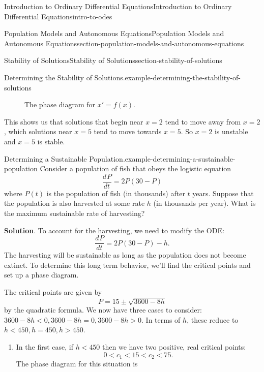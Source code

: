 \documentclass[oneside,10pt,]{book}
\numberwithin{equation}{section}
\newcommand{\dv}[3][]{\dfrac{d^{#1} #2}{d #3^{#1}}}
\newcommand{\lt}{<}
\newcommand{\gt}{>}
\begin{document}
\begin{chapterptx}{Introduction to Ordinary Differential Equations}{}{Introduction to Ordinary Differential Equations}{}{}{intro-to-odes}
\begin{sectionptx}{Population Models and Autonomous Equations}{}{Population Models and Autonomous Equations}{}{}{section-population-models-and-autonomous-equations}
\begin{subsectionptx}{Stability of Solutions}{}{Stability of Solutions}{}{}{section-stability-of-solutions}
\begin{example}{Determining the Stability of Solutions.}{example-determining-the-stability-of-solutions}
\begin{figure}
{
}
\caption{The phase diagram for \(x' = f(x).\)\label{figure-7}}
\end{figure}
\hypertarget{p-127}{}%
This shows us that solutions that begin near \(x = 2\) tend to move away from \(x = 2\), which solutions near \(x = 5\) tend to move towards \(x = 5\). So \(x = 2\) is unstable and \(x = 5\) is stable.%
\end{example}
\begin{example}{Determining a Sustainable Population.}{example-determining-a-sustainable-population}%
\hypertarget{p-128}{}%
Consider a population of fish that obeys the logistic equation%
\begin{equation*}
\dv{P}{t} = 2P(30 - P)
\end{equation*}
where \(P(t)\) is the population of fish (in thousands) after \(t\) years. Suppose that the population is also harvested at some rate \(h\) (in thousands per year). What is the maximum sustainable rate of harvesting?%
\par\smallskip%
\noindent\textbf{Solution}.\hypertarget{solution-22}{}\quad%
\hypertarget{p-129}{}%
To account for the harvesting, we need to modify the ODE:%
\begin{equation*}
\dv{P}{t} = 2P(30 - P) - h.
\end{equation*}
The harvesting will be sustainable as long as the population does not become extinct. To determine this long term behavior, we'll find the critical points and set up a phase diagram.%
\par
\hypertarget{p-130}{}%
The critical points are given by%
\begin{equation*}
P = 15 \pm \sqrt{3600 - 8h}
\end{equation*}
by the quadratic formula. We now have three cases to consider: \(3600 - 8h \lt 0, 3600 - 8h = 0, 3600 - 8h \gt 0.\) In terms of \(h\), these reduce to \(h \lt 450, h = 450, h \gt 450\).%
\leavevmode%
\begin{enumerate}
\item\hypertarget{li-11}{}\hypertarget{p-131}{}%
In the first case, if \(h \lt 450\) then we have two positive, real critical points:%
\begin{equation*}
0 \lt c_{1} \lt 15 \lt c_{2} \lt 75.
\end{equation*}
The phase diagram for this situation is%
\begin{figure}

\end{figure}
\end{enumerate}
\end{example}
\end{subsectionptx}
\end{sectionptx}
\end{chapterptx}
\end{document}
